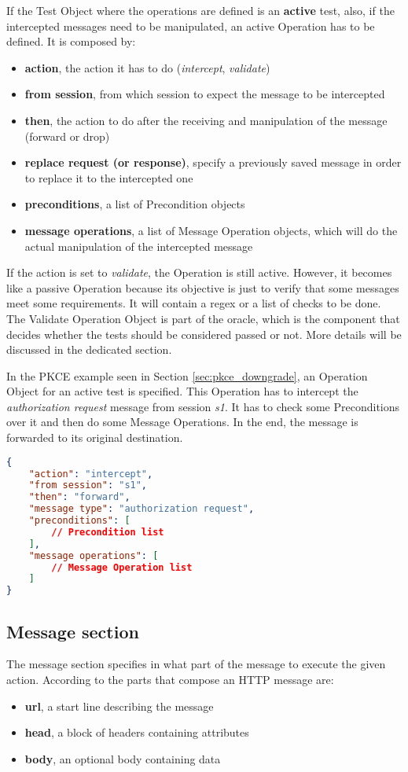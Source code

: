 If the Test Object where the operations are defined is an \textbf{active} test, also, if the intercepted messages need to be manipulated, an active Operation has to be defined. It is composed by:
\begin{itemize}
    \item \textbf{action}, the action it has to do (\textit{intercept}, \textit{validate})
    \item \textbf{from session}, from which session to expect the message to be intercepted
    \item \textbf{then}, the action to do after the receiving and manipulation of the message (forward or drop)
    \item \textbf{replace request (or response)}, specify a previously saved message in order to replace it to the intercepted one
    \item \textbf{preconditions}, a list of Precondition objects
    \item \textbf{message operations}, a list of Message Operation objects, which will do the actual manipulation of the intercepted message
\end{itemize}

If the action is set to \textit{validate}, the Operation is still active. However, it becomes like a passive Operation because its objective is just to verify that some messages meet some requirements. It will contain a regex or a list of checks to be done. The Validate Operation Object is part of the oracle, which is the component that decides whether the tests should be considered passed or not. More details will be discussed in the dedicated section.

In the \gls{PKCE} example seen in Section \ref{sec:pkce_downgrade}, an Operation Object for an active test is specified. This Operation has to intercept the \textit{authorization request} message from session \textit{s1}. It has to check some Preconditions over it and then do some Message Operations. In the end, the message is forwarded to its original destination.

\begin{lstlisting}[language=json, caption=Operation definition]
{
    "action": "intercept",
    "from session": "s1",
    "then": "forward",
    "message type": "authorization request",
    "preconditions": [
        // Precondition list
    ],
    "message operations": [
        // Message Operation list
    ]
}
\end{lstlisting}

\subsection{Message section}
The message section specifies in what part of the message to execute the given action.
According to \cite{http} the parts that compose an HTTP message are:
\begin{itemize}
    \item \textbf{url}, a start line describing the message
    \item \textbf{head}, a block of headers containing attributes
    \item \textbf{body}, an optional body containing data
\end{itemize}

